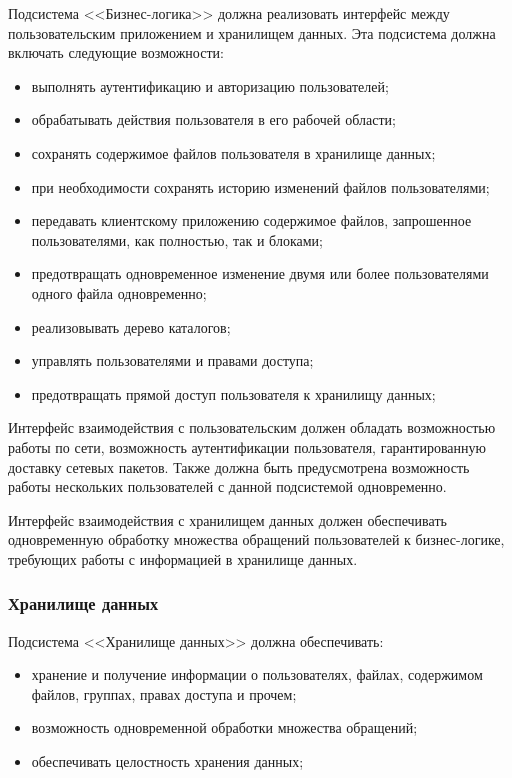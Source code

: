\documentclass[utf8,usehyperref,12pt]{G7-32}
\begin{document}
Подсистема <<Бизнес-логика>> должна реализовать интерфейс между пользовательским приложением и хранилищем данных. Эта подсистема должна включать следующие возможности:
\begin{itemize}
 \item выполнять аутентификацию и авторизацию пользователей;
 \item обрабатывать действия пользователя в его рабочей области;
 \item сохранять содержимое файлов пользователя в хранилище данных;
 \item при необходимости сохранять историю изменений файлов пользователями;
 \item передавать клиентскому приложению содержимое файлов, запрошенное пользователями, как полностью, так и блоками;
 \item предотвращать одновременное изменение двумя или более пользователями одного файла одновременно;
 \item реализовывать дерево каталогов;
 \item управлять пользователями и правами доступа;
 \item предотвращать прямой доступ пользователя к хранилищу данных;
\end{itemize}

Интерфейс взаимодействия с пользовательским должен обладать возможностью работы по сети, возможность аутентификации пользователя, гарантированную доставку сетевых пакетов. Также должна быть предусмотрена возможность работы нескольких пользователей с данной подсистемой одновременно.

Интерфейс взаимодействия с хранилищем данных должен обеспечивать одновременную обработку множества обращений пользователей к бизнес-логике, требующих работы с информацией в хранилище данных. 

\subsubsection{Хранилище данных}

Подсистема <<Хранилище данных>> должна обеспечивать:

\begin{itemize}
 \item хранение и получение информации о пользователях, файлах, содержимом файлов, группах, правах доступа и прочем;
 \item возможность одновременной обработки множества обращений;
 \item обеспечивать целостность хранения данных;
\end{itemize}
\end{document}
